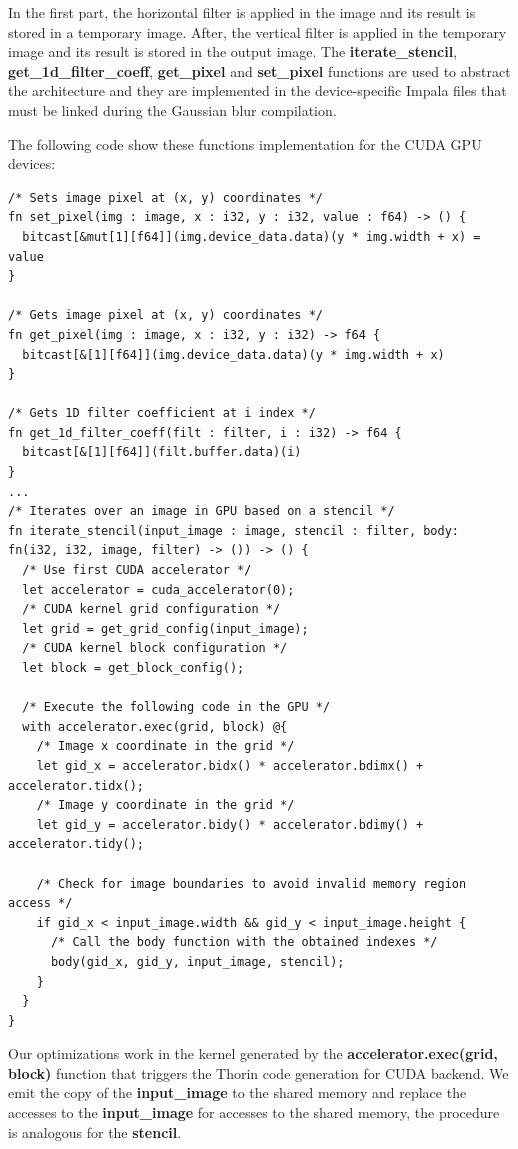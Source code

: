 \documentclass{article}
\begin{document}
In the first part, the horizontal filter is applied in the image and its result is stored in a temporary image. After, the vertical filter is applied in the temporary image and its result is stored in the output image. The \textbf{iterate\_stencil}, \textbf{get\_1d\_filter\_coeff}, \textbf{get\_pixel} and \textbf{set\_pixel} functions are used to abstract the architecture and they are implemented in the device-specific Impala files that must be linked during the Gaussian blur compilation.

The following code show these functions implementation for the CUDA GPU devices:

\begin{verbatim}
/* Sets image pixel at (x, y) coordinates */
fn set_pixel(img : image, x : i32, y : i32, value : f64) -> () {
  bitcast[&mut[1][f64]](img.device_data.data)(y * img.width + x) = value
}

/* Gets image pixel at (x, y) coordinates */
fn get_pixel(img : image, x : i32, y : i32) -> f64 {
  bitcast[&[1][f64]](img.device_data.data)(y * img.width + x)
}

/* Gets 1D filter coefficient at i index */
fn get_1d_filter_coeff(filt : filter, i : i32) -> f64 {
  bitcast[&[1][f64]](filt.buffer.data)(i)
}
...
/* Iterates over an image in GPU based on a stencil */
fn iterate_stencil(input_image : image, stencil : filter, body: fn(i32, i32, image, filter) -> ()) -> () {
  /* Use first CUDA accelerator */
  let accelerator = cuda_accelerator(0);
  /* CUDA kernel grid configuration */
  let grid = get_grid_config(input_image);
  /* CUDA kernel block configuration */
  let block = get_block_config();

  /* Execute the following code in the GPU */
  with accelerator.exec(grid, block) @{
    /* Image x coordinate in the grid */
    let gid_x = accelerator.bidx() * accelerator.bdimx() + accelerator.tidx();
    /* Image y coordinate in the grid */
    let gid_y = accelerator.bidy() * accelerator.bdimy() + accelerator.tidy();

    /* Check for image boundaries to avoid invalid memory region access */
    if gid_x < input_image.width && gid_y < input_image.height {
      /* Call the body function with the obtained indexes */
      body(gid_x, gid_y, input_image, stencil);
    }
  }
}
\end{verbatim}

Our optimizations work in the kernel generated by the \textbf{accelerator.exec(grid, block)} function that triggers the Thorin code generation for CUDA backend. We emit the copy of the \textbf{input\_image} to the shared memory and replace the accesses to the \textbf{input\_image} for accesses to the shared memory, the procedure is analogous for the \textbf{stencil}.
\end{document}
